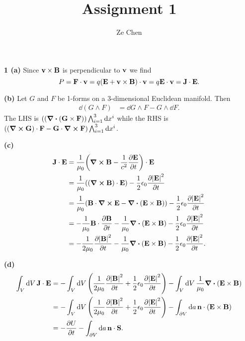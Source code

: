 \documentclass{article}
\title{Assignment 1}
\author{Ze Chen}
\makeatletter
\newcommand*{\shifttext}[1]{%
  \settowidth{\@tempdima}{#1}%
  \hspace{-\@tempdima}#1%
}
\newcommand{\plabel}[1]{%
\shifttext{\textbf{#1}\quad}%
}
\newcommand{\minusbaseline}{\abovedisplayskip=0pt\abovedisplayshortskip=0pt~\vspace*{-\baselineskip}}%
\makeatother
\begin{document}
\maketitle

\plabel{1 (a)}%
Since $\vb{v}\times\vb{B}$ is perpendicular to $\vb{v}$ we find
\[ P = \vb{F}\cdot \vb{v} = q\qty(\vb{E}+\vb{v}\times\vb{B})\cdot\vb{v} = q\vb{E}\cdot \vb{v} = \vb{J}\cdot\vb{E}. \]

\plabel{(b)}%
Let $G$ and $F$ be 1-forms on a $3$-dimensional Euclidean manifold.
Then
\begin{align*}
    \dd{(G\wedge F)} &= \dd{G}\wedge F - G\wedge \dd{F}.
\end{align*}
The LHS is $((\div (\vb{G}\times \vb{F})) \bigwedge_{i=1}^3 \dd{x^i}$ while the RHS is $((\curl \vb{G})\cdot \vb{F} - \vb{G}\cdot \curl\vb{F})\bigwedge_{i=1}^3 \dd{x^i}$.

\plabel{(c)}%
\begingroup\minusbaseline
\begin{align*}
    \vb{J}\cdot\vb{E} &= \frac{1}{\mu_0}\qty(\curl\vb{B} - \frac{1}{c^2} \pdv{\vb{E}}{t})\cdot \vb{E} \\
    &= \frac{1}{\mu_0}\qty((\curl\vb{B})\cdot\vb{E}) - \frac{1}{2}\epsilon_0\pdv{\abs{\vb{E}}^2}{t} \\
    &= \frac{1}{\mu_0}\qty(\vb{B}\cdot \curl\vb{E} - \div(\vb{E}\times\vb{B})) - \frac{1}{2}\epsilon_0\pdv{\abs{\vb{E}}^2}{t} \\
    &= -\frac{1}{\mu_0} \vb{B}\cdot \pdv{\vb{B}}{t}  -\frac{1}{\mu_0}\div(\vb{E}\times\vb{B}) - \frac{1}{2}\epsilon_0\pdv{\abs{\vb{E}}^2}{t} \\
    &= -\frac{1}{2\mu_0}\pdv{\abs{\vb{B}}^2}{t}  -\frac{1}{\mu_0}\div(\vb{E}\times\vb{B}) - \frac{1}{2}\epsilon_0\pdv{\abs{\vb{E}}^2}{t}.
\end{align*}
\endgroup

\plabel{(d)}%
\begingroup\minusbaseline
\begin{align}
    \notag \int_V \dd{V} \vb{J}\cdot \vb{E} &= - \int_V \dd{V} \qty(\frac{1}{2\mu_0}\pdv{\abs{\vb{B}}^2}{t} + \frac{1}{2}\epsilon_0\pdv{\abs{\vb{E}}^2}{t}) - \int_V \dd{V} \frac{1}{\mu_0}\div(\vb{E}\times\vb{B}) \\
    \notag &= - \int_V \dd{V} \qty(\frac{1}{2\mu_0}\pdv{\abs{\vb{B}}^2}{t} + \frac{1}{2}\epsilon_0\pdv{\abs{\vb{E}}^2}{t}) - \int_{\partial V} \dd{a} \vb{n} \cdot (\vb{E}\times\vb{B}) \\
    \label{eq:jeus} &= -\pdv{U}{t} - \int_{\partial V} \dd{a} \vb{n} \cdot \vb{S}.
\end{align}
\endgroup
\end{document}
